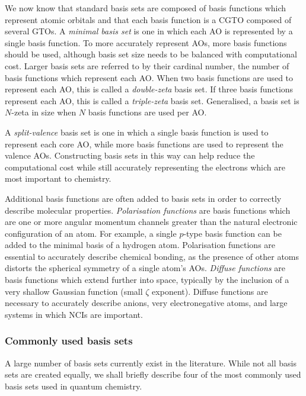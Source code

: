 We now know that standard basis sets are composed of basis functions which represent atomic orbitals and that each basis function is a CGTO composed of several GTOs. A \emph{minimal basis set} is one in which each AO is represented by a single basis function. To more accurately represent AOs, more basis functions should be used, although basis set size needs to be balanced with computational cost. Larger basis sets are referred to by their cardinal number, the number of basis functions which represent each AO. When two basis functions are used to represent each AO, this is called a \emph{double-zeta} basis set. If three basis functions represent each AO, this is called a \emph{triple-zeta} basis set. Generalised, a basis set is $N$-zeta in size when $N$ basis functions are used per AO.

A \emph{split-valence} basis set is one in which a single basis function is used to represent each core AO, while more basis functions are used to represent the valence AOs. Constructing basis sets in this way can help reduce the computational cost while still accurately representing the electrons which are most important to chemistry.

Additional basis functions are often added to basis sets in order to correctly describe molecular properties. \emph{Polarisation functions} are basis functions which are one or more angular momentum channels greater than the natural electronic configuration of an atom. For example, a single $p$-type basis function can be added to the minimal basis of a hydrogen atom. Polarisation functions are essential to accurately describe chemical bonding, as the presence of other atoms distorts the spherical symmetry of a single atom's AOs.\cite{Szabo1996} \emph{Diffuse functions} are basis functions which extend further into space, typically by the inclusion of a very shallow Gaussian function (small $\zeta$ exponent). Diffuse functions are necessary to accurately describe anions, very electronegative atoms, and large systems in which NCIs are important.

\subsubsection{Commonly used basis sets}

A large number of basis sets currently exist in the literature.\cite{Jensen2012} While not all basis sets are created equally, we shall briefly describe four of the most commonly used basis sets used in quantum chemistry. 


